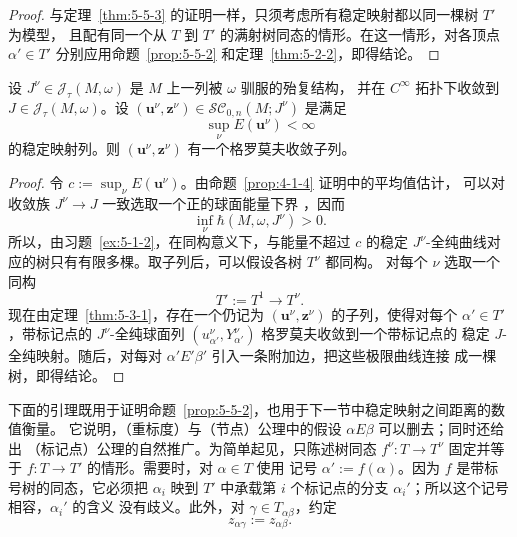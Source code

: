\begin{proof}
与定理~\ref{thm:5-5-3} 的证明一样，只须考虑所有稳定映射都以同一棵树 $T'$ 为模型，
且配有同一个从 $T$ 到 $T'$ 的满射树同态的情形。在这一情形，对各顶点
$\alpha'\in T'$ 分别应用命题~\ref{prop:5-5-2} 和定理~\ref{thm:5-2-2}，即得结论。
\end{proof}

\begin{theorem}\label{thm:5-5-5}
设 $J^\nu\in\mathcal J_\tau(M,\omega)$ 是 $M$ 上一列被 $\omega$ 驯服的殆复结构，
并在 $C^\infty$ 拓扑下收敛到 $J\in\mathcal J_\tau(M,\omega)$。设
$(\mathbf u^\nu,\mathbf z^\nu)\in\mathcal{SC}_{0,n}(M;J^\nu)$ 是满足
\[
  \sup_\nu E(\mathbf u^\nu)<\infty
\]
的稳定映射列。则 $(\mathbf u^\nu,\mathbf z^\nu)$ 有一个格罗莫夫收敛子列。
\end{theorem}

\begin{proof}
令 $c:=\sup_\nu E(\mathbf u^\nu)$。由命题~\ref{prop:4-1-4} 证明中的平均值估计，
可以对收敛族 $J^\nu\to J$ 一致选取一个正的球面能量下界
，因而
\[
  \inf_\nu\hbar(M,\omega,J^\nu)>0.
\]
所以，由习题~\ref{ex:5-1-2}，在同构意义下，与能量不超过 $c$ 的稳定
$J^\nu$-全纯曲线对应的树只有有限多棵。取子列后，可以假设各树 $T^\nu$ 都同构。
对每个 $\nu$ 选取一个同构
\[
  T':=T^1\longrightarrow T^\nu.
\]
现在由定理~\ref{thm:5-3-1}，存在一个仍记为
$(\mathbf u^\nu,\mathbf z^\nu)$ 的子列，使得对每个 $\alpha'\in T'$，带标记点的
$J^\nu$-全纯球面列 $(u_{\alpha'}^\nu,Y_{\alpha'}^\nu)$ 格罗莫夫收敛到一个带标记点的
稳定 $J$-全纯映射。随后，对每对 $\alpha'E'\beta'$ 引入一条附加边，把这些极限曲线连接
成一棵树，即得结论。
\end{proof}

下面的引理既用于证明命题~\ref{prop:5-5-2}，也用于下一节中稳定映射之间距离的数值衡量。
它说明，（重标度）与（节点）公理中的假设 $\alpha E\beta$ 可以删去；同时还给出
（标记点）公理的自然推广。为简单起见，只陈述树同态
$f^\nu:T\to T^\nu$ 固定并等于 $f:T\to T'$ 的情形。需要时，对 $\alpha\in T$ 使用
记号 $\alpha':=f(\alpha)$。因为 $f$ 是带标号树的同态，它必须把 $\alpha_i$ 映到
$T'$ 中承载第 $i$ 个标记点的分支 $\alpha_i'$；所以这个记号相容，$\alpha_i'$ 的含义
没有歧义。此外，对 $\gamma\in T_{\alpha\beta}$，约定
\[
  z_{\alpha\gamma}:=z_{\alpha\beta}.
\]

